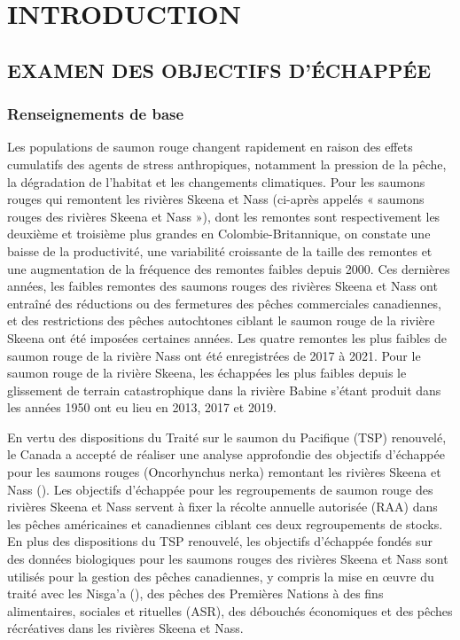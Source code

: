 \documentclass[french,11pt]{book}
\begin{document}
\endgroup{} \endgroup{}

\clearpage

\section{INTRODUCTION}\label{introduction}

\subsection{EXAMEN DES OBJECTIFS D'ÉCHAPPÉE}\label{Project}

\subsubsection{Renseignements de base}\label{Background}

Les populations de saumon rouge changent rapidement en raison des effets cumulatifs des agents de stress anthropiques, notamment la pression de la pêche, la dégradation de l'habitat et les changements climatiques. Pour les saumons rouges qui remontent les rivières Skeena et Nass (ci-après appelés « saumons rouges des rivières Skeena et Nass »), dont les remontes sont respectivement les deuxième et troisième plus grandes en Colombie-Britannique, on constate une baisse de la productivité, une variabilité croissante de la taille des remontes et une augmentation de la fréquence des remontes faibles depuis 2000. Ces dernières années, les faibles remontes des saumons rouges des rivières Skeena et Nass ont entraîné des réductions ou des fermetures des pêches commerciales canadiennes, et des restrictions des pêches autochtones ciblant le saumon rouge de la rivière Skeena ont été imposées certaines années. Les quatre remontes les plus faibles de saumon rouge de la rivière Nass ont été enregistrées de 2017 à 2021. Pour le saumon rouge de la rivière Skeena, les échappées les plus faibles depuis le glissement de terrain catastrophique dans la rivière Babine s'étant produit dans les années 1950 ont eu lieu en 2013, 2017 et 2019.

En vertu des dispositions du Traité sur le saumon du Pacifique (TSP) renouvelé, le Canada a accepté de réaliser une analyse approfondie des objectifs d'échappée pour les saumons rouges (Oncorhynchus nerka) remontant les rivières Skeena et Nass (). Les objectifs d'échappée pour les regroupements de saumon rouge des rivières Skeena et Nass servent à fixer la récolte annuelle autorisée (RAA) dans les pêches américaines et canadiennes ciblant ces deux regroupements de stocks. En plus des dispositions du TSP renouvelé, les objectifs d'échappée fondés sur des données biologiques pour les saumons rouges des rivières Skeena et Nass sont utilisés pour la gestion des pêches canadiennes, y compris la mise en œuvre du traité avec les Nisga'a (), des pêches des Premières Nations à des fins alimentaires, sociales et rituelles (ASR), des débouchés économiques et des pêches récréatives dans les rivières Skeena et Nass.
\end{document}
